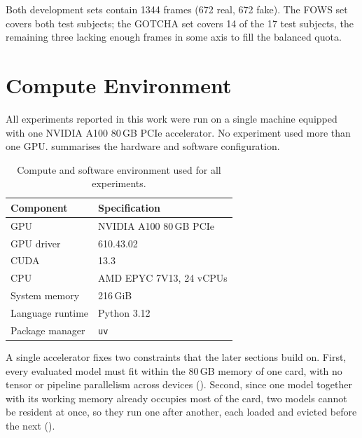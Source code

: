 Both development sets contain \num{1344} frames (\num{672} real, \num{672} fake). The FOWS set covers both test subjects; the GOTCHA set covers 14 of the 17 test subjects, the remaining three lacking enough frames in some axis to fill the balanced quota.


\section{Compute Environment}
\label{sec:compute_env}

All experiments reported in this work were run on a single machine equipped with one NVIDIA A100 80\,GB PCIe accelerator. No experiment used more than one GPU.  summarises the hardware and software configuration.

\begin{table}[t]
	\centering
	\caption{Compute and software environment used for all experiments.}
	\label{tab:hardware}
	\begin{tabular}{ll}
		\toprule
		\textbf{Component} & \textbf{Specification} \\
		\midrule
		GPU              & NVIDIA A100 80\,GB PCIe \\
		GPU driver       & 610.43.02 \\
		CUDA             & 13.3 \\
		CPU              & AMD EPYC 7V13, \num{24} vCPUs \\
		System memory    & \num{216}\,GiB \\
		Language runtime & Python 3.12 \\
		Package manager  & \texttt{uv} \\
		\bottomrule
	\end{tabular}
\end{table}

A single accelerator fixes two constraints that the later sections build on. First, every evaluated model must fit within the \num{80}\,GB memory of one card, with no tensor or pipeline parallelism across devices (). Second, since one model together with its working memory already occupies most of the card, two models cannot be resident at once, so they run one after another, each loaded and evicted before the next ().

